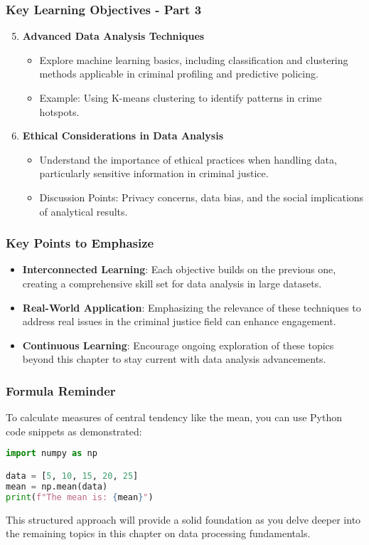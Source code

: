 \documentclass[aspectratio=169]{beamer}
\begin{document}
\begin{frame}[fragile]
    \frametitle{Key Learning Objectives - Part 3}
    \begin{enumerate}
        \setcounter{enumi}{4}
        \item \textbf{Advanced Data Analysis Techniques}
        \begin{itemize}
            \item Explore machine learning basics, including classification and clustering methods applicable in criminal profiling and predictive policing.
            \item Example: Using K-means clustering to identify patterns in crime hotspots.
        \end{itemize}
        
        \item \textbf{Ethical Considerations in Data Analysis}
        \begin{itemize}
            \item Understand the importance of ethical practices when handling data, particularly sensitive information in criminal justice.
            \item Discussion Points: Privacy concerns, data bias, and the social implications of analytical results.
        \end{itemize}
    \end{enumerate}
\end{frame}

\begin{frame}[fragile]
    \frametitle{Key Points to Emphasize}
    \begin{itemize}
        \item \textbf{Interconnected Learning}: Each objective builds on the previous one, creating a comprehensive skill set for data analysis in large datasets.
        \item \textbf{Real-World Application}: Emphasizing the relevance of these techniques to address real issues in the criminal justice field can enhance engagement.
        \item \textbf{Continuous Learning}: Encourage ongoing exploration of these topics beyond this chapter to stay current with data analysis advancements.
    \end{itemize}
\end{frame}

\begin{frame}[fragile]
    \frametitle{Formula Reminder}
    To calculate measures of central tendency like the mean, you can use Python code snippets as demonstrated:
    \begin{lstlisting}[language=Python]
import numpy as np

data = [5, 10, 15, 20, 25]
mean = np.mean(data)
print(f"The mean is: {mean}")
    \end{lstlisting}

    This structured approach will provide a solid foundation as you delve deeper into the remaining topics in this chapter on data processing fundamentals.
\end{frame}
\end{document}
